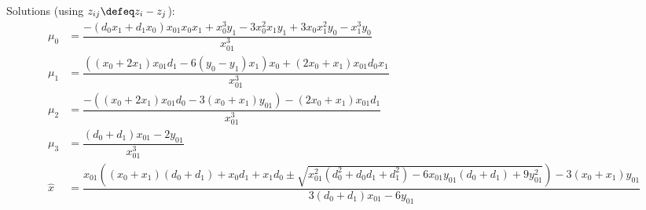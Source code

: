 Solutions (using $z_{ij} \defeq z_i - z_j$):
\begin{equation}
\begin{aligned}
\mu_0 & = \dfrac{
-\left(d_0 x_1+d_1 x_0\right) x_{01} x_0 x_1+x_0^{3} y_1-3
 x_0^{2} x_1 y_1+3 x_0 x_1^{2} y_0-x_1^{3} y_0
}{x_{01}^{3}}
\\
\mu_1 & = \dfrac{
\left(\left(x_0+2 x_1\right) x_{01} d_1-6 \left(y_0-y_1
\right) x_1\right) x_0+\left(2 x_0+x_1\right) x_{01} d_0 x_1
}{
x_{01}^{3}}
\\
\mu_2 & = \dfrac{
-\left(\left(x_0+2 x_1\right) 
x_{01} d_0-3 \left(x_0+x_1\right) y_{01}\right)-
\left(2 x_0+x_1\right) x_{01} d_1
}{
x_{01}^{3}}
\\
\mu_3 & = \dfrac{\left(d_0+d_1\right) x_{01}-2 y_{01}
}{
x_{01}^{3}}
\\
\hat{x} & = \dfrac{
x_{01} \left(
\left(x_0+x_1\right) \left( d_0 + d_1 \right)
+ x_0 d_1 + x_1 d_0
\pm
\sqrt{
x_{01}^2 \left( d_0^2 + d_0 d_1 + d_1^2 \right)
-
6 x_{01} y_{01} \left( d_0 + d_1 \right)
+ 9 y_{01}^2}
\right) 
- 3 \left(x_0+x_1\right) y_{01}
}{
3 \left(d_0+d_1\right) x_{01}-6 y_{01}
}
\end{aligned}
\end{equation}

